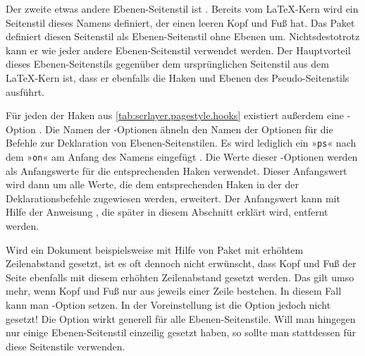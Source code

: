 Der zweite etwas andere Ebenen-Seitenstil ist
. Bereits vom \LaTeX-Kern wird
ein Seitenstil dieses Namens definiert, der einen leeren Kopf und Fuß hat. Das
Paket  definiert diesen Seitenstil als Ebenen-Seitenstil
ohne Ebenen um. Nichtsdestotrotz kann er wie jeder andere Ebenen-Seitenstil
verwendet werden. Der Hauptvorteil dieses Ebenen-Seitenstils gegenüber dem
ursprünglichen Seitenstil aus dem \LaTeX-Kern ist, dass er ebenfalls die
Haken und Ebenen des Pseudo-Seitenstils 
ausführt.%
\EndIndexGroup


\begin{Declaration}
\end{Declaration}
%
%
Für jeden der Haken aus \autoref{tab:scrlayer.pagestyle.hooks}
existiert außerdem eine \KOMAScript-Option%
\iftrue%
. Die Namen der \KOMAScript-Optionen ähneln den Namen der Optionen für die
Befehle zur Deklaration von Ebenen-Seitenstilen. Es wird lediglich ein
»\texttt{ps}« nach dem »\texttt{on}« am Anfang des Namens eingefügt%
\else%
, in deren Namen lediglich ein \texttt{ps} eingefügt wurde%
\fi%
. Die Werte dieser \KOMAScript-Optionen werden als Anfangswerte für die
entsprechenden Haken verwendet. Dieser Anfangswert wird dann um alle Werte,
die dem entsprechenden Haken in der  der
Deklarationsbefehle zugewiesen werden, erweitert. Der Anfangswert kann mit
Hilfe der Anweisung , die
später in diesem Abschnitt erklärt wird, entfernt werden.%
\EndIndexGroup


\begin{Declaration}
\end{Declaration}
Wird ein
Dokument beispielsweise mit Hilfe von Paket
 mit
erhöhtem Zeilenabstand gesetzt, ist es oft dennoch nicht erwünscht, dass Kopf
und Fuß der Seite ebenfalls mit diesem erhöhten Zeilenabstand gesetzt
werden. Das gilt umso mehr, wenn Kopf und Fuß nur aus jeweils einer Zeile
bestehen. In diesem Fall kann man \KOMAScript-Option 
setzen. In der Voreinstellung ist die Option jedoch
nicht gesetzt! Die Option wirkt generell für alle Ebenen-Seitenstile. Will man
hingegen nur einige Ebenen-Seitenstil einzeilig gesetzt haben, so sollte man
stattdessen für diese Seitenstile
verwenden.%
\EndIndexGroup


